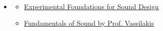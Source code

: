\begin{itemize}[noitemsep,topsep=0pt,leftmargin=*]
      \item {}
            \begin{resenv}
                  \begin{itemize}
                        \item \href{https://www.kadenze.com/courses/experimental-foundations-for-sound-design/info}{Experimental Foundations for Sound Design}
                        \item \href{http://www.acousticslab.org/RECA220/}{Fundamentals of Sound by Prof. Vassilakis}
                  \end{itemize}
            \end{resenv}

\end{itemize}